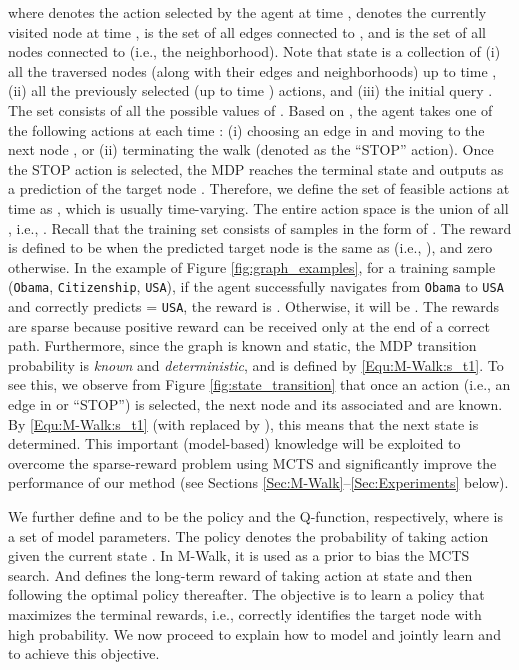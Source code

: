 \documentclass{article}
\newcommand{\modelname}{M-Walk}
\begin{document}
    \noindent where  denotes the action selected by the agent at time ,  denotes the currently visited node at time ,   is the set of all edges connected to , and  is the set of all nodes connected to  (i.e., the neighborhood). Note that state  is a collection of (i) all the traversed nodes (along with their edges and neighborhoods) up to time , (ii) all the previously selected (up to time ) actions, and (iii) the initial query . The set  consists of all the possible values of . Based on , the agent takes one of the following actions at each time : (i) choosing an edge in  and moving to the next node , or (ii) terminating the walk (denoted as the ``STOP'' action). Once the STOP action is selected, the MDP reaches the terminal state and outputs  as a prediction of the target node . Therefore, we define the set of feasible actions at time  as , which is usually time-varying. The entire action space  is the union of all , i.e., . Recall that the training set consists of samples in the form of . The reward is defined to be  when the predicted target node  is the same as  (i.e., ), and zero otherwise. In the example of Figure \ref{fig:graph_examples}, for a training sample (\texttt{Obama}, \texttt{Citizenship}, \texttt{USA}), if the agent successfully navigates from \texttt{Obama} to \texttt{USA} and correctly predicts  = \texttt{USA}, the reward is . Otherwise, it will be . The rewards are sparse because positive reward can be received only at the end of a correct path. Furthermore, since the graph  is known and static, the MDP transition probability  is \emph{known} and \emph{deterministic}, and is defined by \eqref{Equ:\modelname:s_t1}. To see this, we observe from Figure \ref{fig:state_transition} that once an action  (i.e., an edge in  or ``STOP'') is selected, the next node  and its associated  and  are known. By \eqref{Equ:\modelname:s_t1} (with  replaced by ), this means that the next state  is determined. This important (model-based) knowledge will be exploited to overcome the sparse-reward problem using MCTS and significantly improve the performance of our method (see Sections \ref{Sec:\modelname}--\ref{Sec:Experiments} below). 
    
    We further define  and  to be the policy and the Q-function, respectively, where  is a set of model parameters. The policy  denotes the probability of taking action  given the current state . In \modelname, it is used as a prior to bias the MCTS search. And  defines the long-term reward of taking action  at state  and then following the optimal policy thereafter. The objective is to learn a policy that maximizes the terminal rewards, i.e., correctly identifies the target node with high probability. We now proceed to explain how to model and jointly learn  and  to achieve this objective.
\end{document}
